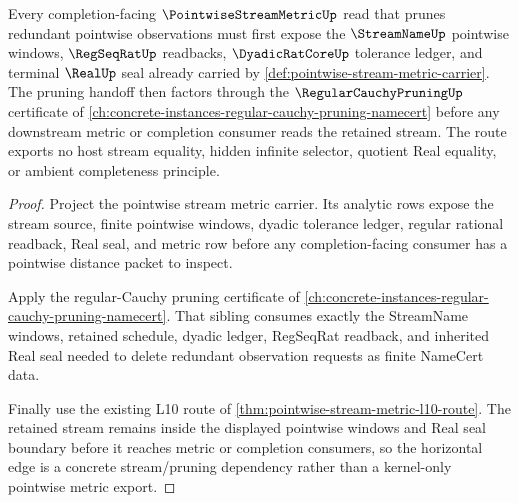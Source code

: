 \begin{theorem}
\label{thm:pointwise-stream-metric-regular-cauchy-pruning-route}
Every completion-facing $\PointwiseStreamMetricUp$ read that prunes redundant pointwise observations must first expose the $\StreamNameUp$ pointwise windows, $\RegSeqRatUp$ readbacks, $\DyadicRatCoreUp$ tolerance ledger, and terminal $\RealUp$ seal already carried by \autoref{def:pointwise-stream-metric-carrier}. The pruning handoff then factors through the $\RegularCauchyPruningUp$ certificate of \autoref{ch:concrete-instances-regular-cauchy-pruning-namecert} before any downstream metric or completion consumer reads the retained stream. The route exports no host stream equality, hidden infinite selector, quotient Real equality, or ambient completeness principle.
\end{theorem}
\begin{proof}
Project the pointwise stream metric carrier. Its analytic rows expose the stream source, finite pointwise windows, dyadic tolerance ledger, regular rational readback, Real seal, and metric row before any completion-facing consumer has a pointwise distance packet to inspect.

Apply the regular-Cauchy pruning certificate of \autoref{ch:concrete-instances-regular-cauchy-pruning-namecert}. That sibling consumes exactly the StreamName windows, retained schedule, dyadic ledger, RegSeqRat readback, and inherited Real seal needed to delete redundant observation requests as finite NameCert data.

Finally use the existing L10 route of \autoref{thm:pointwise-stream-metric-l10-route}. The retained stream remains inside the displayed pointwise windows and Real seal boundary before it reaches metric or completion consumers, so the horizontal edge is a concrete stream/pruning dependency rather than a kernel-only pointwise metric export.
\end{proof}
